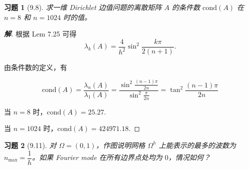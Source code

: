 \documentclass{ctexart}
\newtheorem{ex}{习题}
\newenvironment{sol}{\begin{proof}[\bf 解]}{\end{proof}}
\begin{document}
\begin{ex}[9.8]
    求一维 Dirichlet 边值问题的离散矩阵 $A$ 的条件数 $\mathrm{cond}(A)$ 在 $n=8$ 和 $n=1024$ 时的值。
\end{ex}

\begin{sol}
    根据 Lem 7.25 可得
    \begin{equation}
        \lambda_k(A) = \dfrac 4{h^2}\sin^2\dfrac{k\pi}{2(n+1)}.
    \end{equation}
    
    由条件数的定义，有
    
    \begin{equation}
        \mathrm{cond}(A) = \dfrac {\lambda_n(A)}{\lambda_1(A)} = \dfrac {\sin^2 \frac {(n-1)\pi}{2n}}{\sin^2 \frac {\pi}{2n}} = \tan^2 \dfrac{(n-1)\pi}{2n}
    \end{equation}
    
    当 $n=8$ 时，$\mathrm{cond}(A) = 25.27$.
    
    当 $n=1024$ 时，$\mathrm{cond}(A) = 424971.18$.
\end{sol}

\begin{ex}[9.11]
    对 $\Omega = (0,1)$，作图说明网格 $\Omega^h$ 上能表示的最多的波数为 $n_{\max} = \dfrac 1h$。如果 Fourier mode 在所有边界点处均为 $0$，情况如何？
\end{ex}
\end{document}
